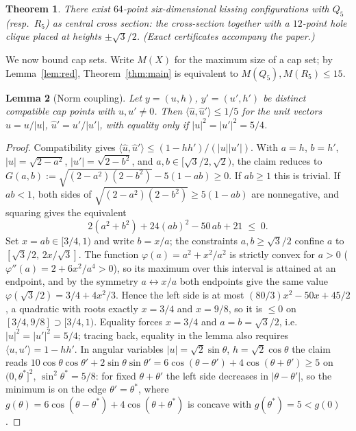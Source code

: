 \documentclass[11pt]{article}
\newtheorem{theorem}{Theorem}
\newtheorem{lemma}[theorem]{Lemma}
\theoremstyle{remark}
\newcommand{\ip}[2]{\langle #1,#2\rangle}
\begin{document}
\begin{theorem}\label{thm:64}
There exist $64$-point six-dimensional kissing configurations with
$Q_5$ (resp.\ $R_5$) as central cross section: the cross-section
together with a $12$-point hole clique placed at heights
$\pm\sqrt3/2$. (Exact certificates accompany the paper.)
\end{theorem}

We now bound cap sets. Write $M(X)$ for the maximum size of a cap set;
by Lemma~\ref{lem:red}, Theorem~\ref{thm:main} is equivalent to
$M(Q_5),M(R_5)\le 15$.

\begin{lemma}[Norm coupling]\label{lem:unitip}
Let $y=(u,h)$, $y'=(u',h')$ be distinct compatible cap points with
$u,u'\ne 0$. Then $\ip{\hat u}{\hat u'}\le 1/5$ for the unit vectors
$\hat u = u/|u|$, $\hat u'=u'/|u'|$, with equality only if
$|u|^2=|u'|^2=5/4$.
\end{lemma}

\begin{proof}
Compatibility gives $\ip{\hat u}{\hat u'}\le(1-hh')/(|u||u'|)$. With
$a=h$, $b=h'$, $|u|=\sqrt{2-a^2}$, $|u'|=\sqrt{2-b^2}$, and
$a,b\in[\sqrt3/2,\sqrt2)$, the claim reduces to
$G(a,b):=\sqrt{(2-a^2)(2-b^2)}-5(1-ab)\ge 0$. If $ab\ge 1$ this is
trivial. If $ab<1$, both sides of
$\sqrt{(2-a^2)(2-b^2)}\ge 5(1-ab)$ are nonnegative, and squaring gives
the equivalent
\[
2(a^2+b^2) + 24(ab)^2 - 50\,ab + 21 \;\le\; 0 .
\]
Set $x=ab\in[3/4,1)$ and write $b=x/a$; the constraints
$a,b\ge\sqrt3/2$ confine $a$ to $[\sqrt3/2,\,2x/\sqrt3]$. The function
$\varphi(a)=a^2+x^2/a^2$ is strictly convex for $a>0$
($\varphi''(a)=2+6x^2/a^4>0$), so its maximum over this interval is
attained at an endpoint, and by the symmetry $a\leftrightarrow x/a$ both
endpoints give the same value $\varphi(\sqrt3/2)=3/4+4x^2/3$. Hence the
left side is at most
$(80/3)x^2-50x+45/2$, a quadratic with roots exactly $x=3/4$ and
$x=9/8$, so it is $\le 0$ on $[3/4,9/8]\supset[3/4,1)$. Equality forces
$x=3/4$ and $a=b=\sqrt3/2$, i.e.\ $|u|^2=|u'|^2=5/4$; tracing back,
equality in the lemma also requires $\ip{u}{u'}=1-hh'$.
In angular variables $|u|=\sqrt2\sin\theta$, $h=\sqrt2\cos\theta$ the
claim reads
$10\cos\theta\cos\theta'+2\sin\theta\sin\theta'
=6\cos(\theta-\theta')+4\cos(\theta+\theta')\ge 5$ on $(0,\theta^*]^2$,
$\sin^2\theta^*=5/8$: for fixed $\theta+\theta'$ the left side decreases
in $|\theta-\theta'|$, so the minimum is on the edge $\theta'=\theta^*$,
where $g(\theta)=6\cos(\theta-\theta^*)+4\cos(\theta+\theta^*)$ is
concave with $g(\theta^*)=5<g(0)$.
\end{proof}
\end{document}
